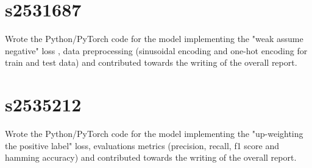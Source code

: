 \documentclass{article}
\begin{document}
\section*{s2531687}
Wrote the Python/PyTorch code for the model implementing the "weak assume negative" loss ,  data preprocessing (sinusoidal encoding and one-hot encoding for train and test data) and contributed towards the writing of the overall report.
\section*{s2535212}
 Wrote the Python/PyTorch code for the model implementing the "up-weighting the positive label" loss, evaluations metrics (precision, recall, f1 score and hamming accuracy) and contributed towards the writing of the overall report.
 
\end{document}
